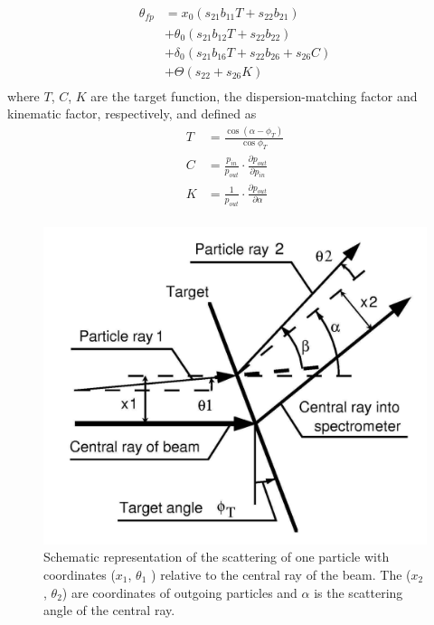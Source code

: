 \begin{equation}
    \label{eq:theta_fp}
    \begin{aligned}
     \theta_{fp} &= x_0(s_{21} b_{11} T + s_{22} b_{21})        \\
                 &+ \theta_0(s_{21}b_{12}T + s_{22} b_{22})     \\
                 &+ \delta_0(s_{21}b_{16}T + s_{22}b_{26} + s_{26}C) \\
                 &+ \Theta(s_{22} + s_{26}K)                    \\
    \end{aligned}
\end{equation}
where $T$, $C$, $K$ are the target function, the dispersion-matching factor and  kinematic factor,  respectively,  and defined as
\begin{equation}
    \label{eq:TKC}
    \begin{aligned}
     T & = \frac{\cos(\alpha - \phi_T)}{\cos \phi_T}                        \\
     C & = \frac{p_{in}}{p_{out}} \cdot \frac{\partial p_{out}}{\partial p_{in}} \\
     K & = \frac{1}{p_{out}} \cdot   \frac{\partial p_{out}}{\partial \alpha}  \\
    \end{aligned}
\end{equation}

\begin{figure}[tpb]
  \begin{center}
    \centerline{\includegraphics[scale=0.18]{graph/ch3/kinectics}}
    \caption{Schematic representation of the scattering of one particle with coordinates ($x_1$, $\theta_1$ )
relative to the central ray of the beam. The ($x_2$, $\theta_2$) are coordinates of outgoing particles and $\alpha$ is the
scattering angle of the central ray.}
    \label{fig:kinectics}
  \end{center}
\end{figure}

